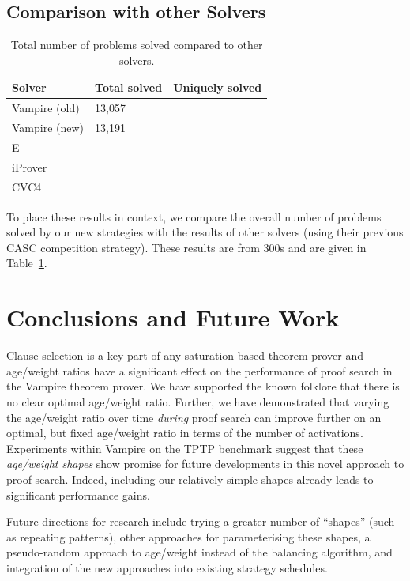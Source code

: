 \documentclass{llncs}
\begin{document}
\subsection{Comparison with other Solvers}

\begin{table}[t]
\caption{Total number of problems solved compared to other solvers.\label{tab:other}}
\centering
\begin{tabular}{l|l|l}
Solver 		& Total solved & Uniquely solved \\ \hline
Vampire (old)	& 13,057 & \\
Vampire (new)   & 13,191 & \\
E 			& \\
iProver		& \\
CVC4		& \\
\end{tabular}
\end{table}

To place these results in context, we compare the overall number of problems solved by our new strategies with the results of other solvers (using their previous CASC competition strategy). These results are from 300s and are given in Table~\ref{tab:other}. 

\section{Conclusions and Future Work}
\label{sec:conclusions}

Clause selection is a key part of any saturation-based theorem prover and age/weight ratios have a significant effect on the performance of proof search in the Vampire theorem prover. We have supported the known folklore that there is no clear optimal age/weight ratio.
Further, we have demonstrated that varying the age/weight ratio over time \emph{during} proof search can improve further on an optimal, but fixed age/weight ratio in terms of the number of activations.
Experiments within Vampire on the TPTP benchmark suggest that these \emph{age/weight shapes} show promise for future developments in this novel approach to proof search. Indeed, including our relatively simple shapes already leads to significant performance gains.

Future directions for research include trying a greater number of ``shapes'' (such as repeating patterns), other approaches for parameterising these shapes, a pseudo-random approach to age/weight instead of the balancing algorithm, and integration of the new approaches into existing strategy schedules.


\end{document}
